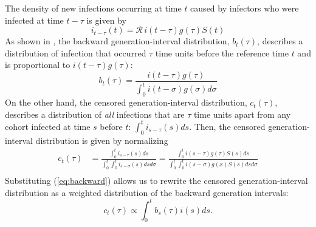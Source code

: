 \documentclass[12pt]{article}
\newcommand{\eref}[1]{(\ref{eq:#1})}
\newcommand{\RR}{\ensuremath{{\mathcal R}}}
\begin{document}
The density of new infections occurring at time $t$ caused by infectors who were infected at time $t-\tau$ is given by
\begin{equation}
i_{t-\tau}(t) = \RR \, i(t-\tau) g(\tau) S(t)
\end{equation}
As shown in \cite{champredon2015intrinsic}, the backward generation-interval distribution, $b_t(\tau)$, describes a distribution of infection that occurred $\tau$ time units before the reference time $t$ and is proportional to $i(t-\tau) g(\tau)$:
\begin{equation}\label{eq:backward}
b_t(\tau) = \frac{i(t-\tau) g(\tau)}{\int_0^t i(t-\sigma) g(\sigma) d\sigma}
\end{equation}
On the other hand, the censored generation-interval distribution, $c_t(\tau)$, describes a distribution of \emph{all} infections that are $\tau$ time units apart from any cohort infected at time $s$ before $t$: $\int_0^t i_{s-\tau}(s) ds$.
Then, the censored generation-interval distribution is given by normalizing
\begin{equation}\label{eq:obsg}
\begin{aligned}
c_t(\tau) 
&= \frac{\int_0^t i_{s-\tau}(s) ds}{\int_0^t \int_0^t i_{s-\sigma}(s) ds d\sigma}= \frac{\int_0^t i(s-\tau) g(\tau) S(s) ds}{\int_0^t \int_0^t i(s-\sigma) g(x) S(s) ds d\sigma}\\
\end{aligned}
\end{equation}
Substituting \eref{backward} allows us to rewrite the censored generation-interval distribution as a weighted distribution of the backward generation intervals:
\begin{equation}
c_t(\tau) \propto \int_0^t b_s(\tau) i(s) ds.
\end{equation}
\end{document}
